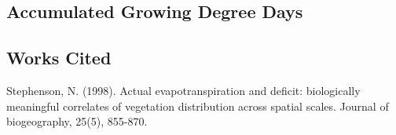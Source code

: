 \documentclass[
]{article}
\begin{document}
\hypertarget{accumulated-growing-degree-days}{%
\subsection{Accumulated Growing Degree
Days}\label{accumulated-growing-degree-days}}

\hypertarget{works-cited}{%
\subsection{Works Cited}\label{works-cited}}

Stephenson, N. (1998). Actual evapotranspiration and deficit:
biologically meaningful correlates of vegetation distribution across
spatial scales. Journal of biogeography, 25(5), 855-870.
\end{document}
